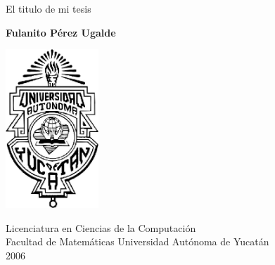 \begin{titlepage}
\begin{center}
\vspace*{1in}
{\LARGE
El titulo de mi tesis\\[4mm]}
\vspace*{3cm}

{\large
{\bf Fulanito Pérez Ugalde}

\vspace*{25mm}

\begin{center}
\includegraphics[width=3.5cm]{crest_uady.png}
\end{center}

\vspace*{45mm}

Licenciatura en Ciencias de la Computación\\
Facultad de Matemáticas
Universidad Autónoma de Yucatán\\
2006
}
\end{center}

\end{titlepage}

